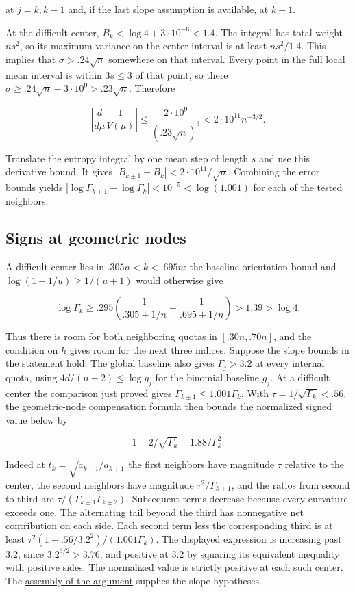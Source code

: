 \documentclass[11pt]{article}
\begin{document}
at $j=k,k-1$ and, if the last slope assumption is available, at $k+1$.

At the difficult center, $B_k<\log 4+3\cdot10^{-6}<1.4$.
The integral has total weight $ns^2$, so its maximum variance on the
center interval is at least $ns^2/1.4$. This implies that
$\sigma>.24\sqrt n$ somewhere on that interval.
Every point in the full local mean interval is within $3s\le3$
of that point, so there $\sigma\ge .24\sqrt n-3\cdot10^9>.23\sqrt n$.
Therefore

\[
\left|\frac{d}{d\mu}\frac1{V(\mu)}\right|
\le\frac{2\cdot10^9}{(.23\sqrt n)^3}<2\cdot10^{11}n^{-3/2}.
\]

Translate the entropy integral by one mean step of length $s$ and use this
derivative bound. It gives $|B_{k\pm1}-B_k|<2\cdot10^{11}/\sqrt n$.
Combining the error bounds yields
$|\log\Gamma_{k\pm1}-\log\Gamma_k|<10^{-5}<\log(1.001)$
for each of the tested neighbors.

\subsection{Signs at geometric nodes}

A difficult center lies in $.305n<k<.695n$:
the baseline orientation bound and
$\log(1+1/u)\ge1/(u+1)$ would otherwise give

\[
\log\Gamma_k\ge .295
\left(\frac1{.305+1/n}+\frac1{.695+1/n}\right)>1.39>\log4 .
\]

Thus there is room for both neighboring quotas in $[.30n,.70n]$, and
the condition on $h$ gives room for the next three indices. Suppose the slope bounds in the statement hold.
The global baseline also gives $\Gamma_j>3.2$ at every internal quota,
using $4d/(n+2)\le\log g_j$ for the binomial baseline $g_j$.
At a difficult center the comparison just proved gives
$\Gamma_{k\pm1}\le1.001\Gamma_k$.
With $\tau=1/\sqrt{\Gamma_k}<.56$, the geometric-node compensation
formula then bounds the normalized signed value below by

\[
1-2/\sqrt{\Gamma_k}+1.88/\Gamma_k^2.
\]

Indeed at $t_k=\sqrt{a_{k-1}/a_{k+1}}$ the first neighbors have magnitude $\tau$ relative to the center, the second neighbors have magnitude $\tau^2/\Gamma_{k\pm1}$, and the ratios from second to third are $\tau/(\Gamma_{k\pm1}\Gamma_{k\pm2})$. Subsequent terms decrease because every curvature exceeds one. The alternating tail beyond the third has nonnegative net contribution on each side. Each second term less the corresponding third is at least $\tau^2(1-.56/3.2^2)/(1.001\Gamma_k)$. The displayed expression is increasing past $3.2$, since
$3.2^{3/2}>3.76$, and positive at $3.2$ by squaring its equivalent
inequality with positive sides. The normalized value is strictly positive at each such center. The \href{https://github.com/ProgramComputer/open-math-research/blob/main/topics/balanced-arrays/adjacent-quotas/README.md}{assembly of the argument} supplies the slope hypotheses.
\end{document}
